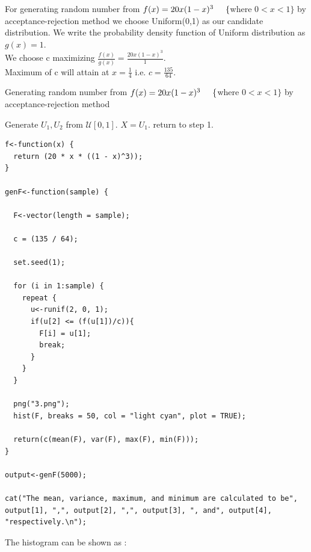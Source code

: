\documentclass[11pt]{article}
\begin{document}
  For generating random number from $f(x) = 20x(1-x)^{3} \hspace{5mm} \{$where $0 < x < 1\}$ by acceptance-rejection method we choose Uniform(0,1) as our candidate distribution. We write the probability density function of Uniform distribution as $g(x) = 1$.\\
We choose c maximizing $\frac{f(x)}{g(x)} = \frac{20x(1-x)^{3}}{1}$.\\
Maximum of c will attain at $x = \frac{1}{4}$ i.e. $c = \frac{135}{64}$.

\begin{algorithm}[H]
\caption{Generating random number from $f(x) = 20x(1-x)^{3} \hspace{5mm} \{$where $0 < x < 1\}$ by acceptance-rejection method}
\begin{algorithmic}[1]
\STATE Generate $U_1, U_2$ from $\mathcal{U}[0,1]$.
{}
  \STATE  $X = U_1$.
\ELSE
  \STATE  return to step 1.
\ENDIF
\end{algorithmic}
\end{algorithm}


\begin{lstlisting}
f<-function(x) {
  return (20 * x * ((1 - x)^3));
}

genF<-function(sample) {

  F<-vector(length = sample);

  c = (135 / 64);

  set.seed(1);

  for (i in 1:sample) {
    repeat {
      u<-runif(2, 0, 1);
      if(u[2] <= (f(u[1])/c)){
        F[i] = u[1];
        break;
      }
    }
  }

  png("3.png");
  hist(F, breaks = 50, col = "light cyan", plot = TRUE);

  return(c(mean(F), var(F), max(F), min(F)));
}

output<-genF(5000);

cat("The mean, variance, maximum, and minimum are calculated to be", output[1], ",", output[2], ",", output[3], ", and", output[4], "respectively.\n");

\end{lstlisting}
\newpage
{}

The histogram can be shown as :
\end{document}
